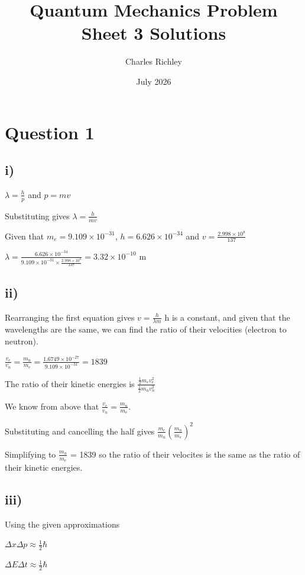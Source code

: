 \documentclass{article}
\title{Quantum Mechanics Problem Sheet 3 Solutions}
\author{Charles Richley}
\date{July 2026}
\begin{document}
\maketitle

\section{Question 1}

\subsection*{i)}
$\lambda = \frac{h}{p}$ and $p = mv$ 

Substituting gives $\lambda = \frac{h}{mv}$

Given that $m_e = 9.109  \times 10^{-31}$, $h = 6.626 \times10^{-34}$ and $v = \frac{2.998 \times 10^{8}}{137}$

$\lambda = \frac{6.626 \times 10^{-34}}{9.109 \times 10^{-31} \times \frac{2.998 \times 10^{8}}{137}} = 3.32 \times 10^{-10} \text{ m}$

\subsection*{ii)}
Rearranging the first equation gives $v = \frac{h}{\lambda m}$
h is a constant, and given that the wavelengths are the same, we can find the ratio of their velocities (electron to neutron).

$\frac{v_e}{v_n} = \frac{m_n}{m_e} = \frac{1.6749 \times 10^{-27}}{9.109 \times 10^{-31}} = 1839$

The ratio of their kinetic energies is $\frac{\frac{1}{2}m_e v_e^2}{\frac{1}{2} m_n v_n^2}$

We know from above that $\frac{v_e}{v_n} = \frac{m_n}{m_e}$.

Substituting and cancelling the half gives $\frac{m_e}{m_n} (\frac{m_n}{m_e})^2$ 

Simplifying to $\frac{m_n}{m_e}$ = 1839 so the ratio of their velocites is the same as the ratio of their kinetic energies.

\subsection*{iii)}
Using the given approximations

$\Delta x\Delta p \approx \frac{1}{2} \hbar$

$\Delta E \Delta t \approx \frac{1}{2} \hbar$
\end{document}
